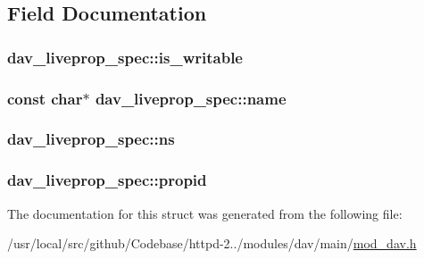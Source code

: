 \subsection{Field Documentation}
\subsubsection[{\texorpdfstring{is\+\_\+writable}{is_writable}}]{ dav\+\_\+liveprop\+\_\+spec\+::is\+\_\+writable}\hypertarget{structdav__liveprop__spec_a57b58fba23a10087f055357a9768638a}{}\label{structdav__liveprop__spec_a57b58fba23a10087f055357a9768638a}
\subsubsection[{\texorpdfstring{name}{name}}]{\setlength{\rightskip}{0pt plus 5cm}const char$\ast$ dav\+\_\+liveprop\+\_\+spec\+::name}\hypertarget{structdav__liveprop__spec_ae8cf566af412b4ca52f21b3afe095e21}{}\label{structdav__liveprop__spec_ae8cf566af412b4ca52f21b3afe095e21}
\subsubsection[{\texorpdfstring{ns}{ns}}]{ dav\+\_\+liveprop\+\_\+spec\+::ns}\hypertarget{structdav__liveprop__spec_abfd7ee4ace341c9c7b9f66a7d34fd049}{}\label{structdav__liveprop__spec_abfd7ee4ace341c9c7b9f66a7d34fd049}
\subsubsection[{\texorpdfstring{propid}{propid}}]{ dav\+\_\+liveprop\+\_\+spec\+::propid}\hypertarget{structdav__liveprop__spec_a31fc4cf78979d24ec23ca9ee1631856c}{}\label{structdav__liveprop__spec_a31fc4cf78979d24ec23ca9ee1631856c}


The documentation for this struct was generated from the following file\+:\begin{DoxyCompactItemize}
\item 
/usr/local/src/github/\+Codebase/httpd-\/2../modules/dav/main/\hyperlink{mod__dav_8h}{mod\+\_\+dav.\+h}\end{DoxyCompactItemize}
